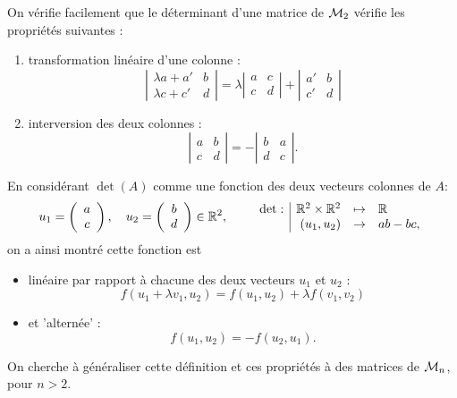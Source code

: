\remark
On vérifie facilement que le déterminant d'une matrice de $\mathcal{M}_2$ vérifie les propriétés suivantes : 
\begin{enumerate}
  \item transformation linéaire d'une colonne :
  $$
  \left| \begin{array}{cc} \lambda a + a' & b \\ \lambda c + c' & d \end{array} \right|
  =
  \lambda \left| \begin{array}{cc} a & c \\ c & d \end{array} \right|
  +
  \left| \begin{array}{cc} a' & b \\ c ' & d \end{array} \right|
  $$
  \item interversion des deux colonnes :
  $$
  \left| \begin{array}{cc} a & b \\ c & d \end{array} \right|
  =
  - \left| \begin{array}{cc} b & a \\ d & c \end{array} \right|.
  $$
\end{enumerate}
En considérant $\det(A)$ comme une fonction des deux vecteurs colonnes de $A$:
$$
u_1 = \left(\begin{array}{c}a \\c \end{array} \right), \quad
u_2 = \left(\begin{array}{c}b \\d \end{array} \right) \in \mathbb{R}^2, \qquad
\begin{array}{r|rcl}
  \det : & \mathbb{R}^2 \times \mathbb{R}^2 & \mapsto & \mathbb{R} \\
  & (u_1, u_2) & \rightarrow & ab - bc,
\end{array}
$$
on a ainsi montré cette fonction est 
\begin{itemize}
 \item linéaire par rapport à chacune des deux vecteurs $u_1$ et $u_2$ :
 $$
 f(u_1 + \lambda v_1, u_2) = f(u_1, u_2) + \lambda f(v_1, v_2)
 $$
 \item et 'alternée' :
 $$
 f(u_1, u_2) = -f(u_2, u_1).
 $$
\end{itemize}

\bigskip
On cherche à généraliser cette définition et ces propriétés à des matrices de $\mathcal{M}_n$, pour $n > 2$.


